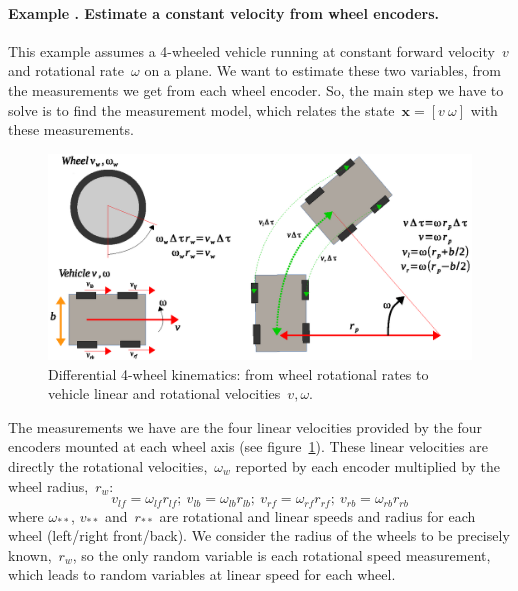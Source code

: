 \paragraph{Example \theexamplecounter. Estimate a constant velocity from wheel encoders.}
This example assumes a 4-wheeled vehicle running at constant forward velocity~$v$ and rotational rate~$\omega$ on a plane.
We want to estimate these two variables, from the measurements we get from each wheel encoder. So, the main step we have to solve is to find the measurement model, which relates the state~$\mathbf{x}=[v\ \omega]$ with these measurements.
\begin{figure}[h!]
  \includegraphics[width=1\linewidth]{figures/wheel-4diff_kinematics.eps}
  \caption{Differential 4-wheel kinematics: from wheel rotational rates to vehicle linear and rotational velocities~$v,\omega$.}
  \label{fig:wheel-4diff_kinematics}
\end{figure}

The measurements we have are the four linear velocities provided by the four encoders mounted at each wheel axis (see figure~\ref{fig:wheel-4diff_kinematics}). These linear velocities are directly the rotational velocities,~$\omega_w$ reported by each encoder multiplied by the wheel radius,~$r_w$:
\begin{equation}
v_{lf} = \omega_{lf}r_{lf};\ v_{lb} = \omega_{lb}r_{lb};\ v_{rf} = \omega_{rf}r_{rf};\ v_{rb} = \omega_{rb}r_{rb}
\end{equation}
where $\omega_{**}$, $v_{**}$ and~$r_{**}$ are rotational and linear speeds and radius for each wheel (left/right front/back). We consider the radius of the wheels to be precisely known,~$r_w$, so the only random variable is each rotational speed measurement, which leads to random variables at linear speed for each wheel. 


